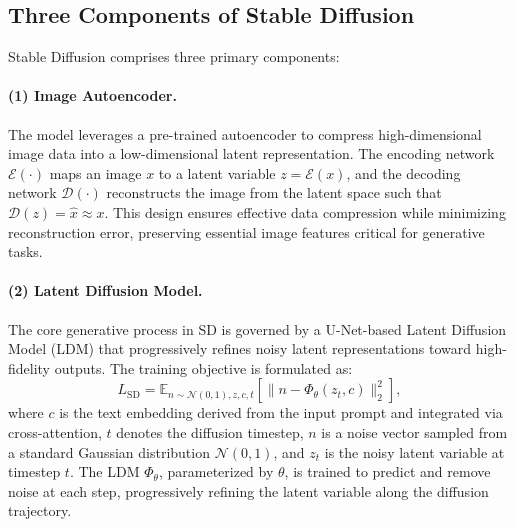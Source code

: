 
\subsection{Three Components of Stable Diffusion }

Stable Diffusion comprises three primary components:

\paragraph{(1) Image Autoencoder.} The model leverages a pre-trained autoencoder to compress high-dimensional image data into a low-dimensional latent representation. The encoding network $\mathcal{E}(\cdot)$ maps an image $x$ to a latent variable $z = \mathcal{E}(x)$, and the decoding network $\mathcal{D}(\cdot)$ reconstructs the image from the latent space such that $\mathcal{D}(z) = \hat{x} \approx x$. This design ensures effective data compression while minimizing reconstruction error, preserving essential image features critical for generative tasks.



\paragraph{(2) Latent Diffusion Model.} The core generative process in SD is governed by a U-Net-based Latent Diffusion Model (LDM) that progressively refines noisy latent representations toward high-fidelity outputs. The training objective is formulated as:
\begin{equation}
    L_{\text{SD}} = \mathbb{E}_{n \sim \mathcal{N}(0,1), z, c, t} \left[
    \| n - \Phi_{\theta}(z_t, c) \|_2^2
    \right],
\end{equation}
where $c$ is the text embedding derived from the input prompt and integrated via cross-attention, $t$ denotes the diffusion timestep, $n$ is a noise vector sampled from a standard Gaussian distribution $\mathcal{N}(0,1)$, and $z_t$ is the noisy latent variable at timestep $t$. The LDM \( \Phi_{\theta} \), parameterized by \( \theta \), is trained to predict and remove noise at each step, progressively refining the latent variable along the diffusion trajectory.


